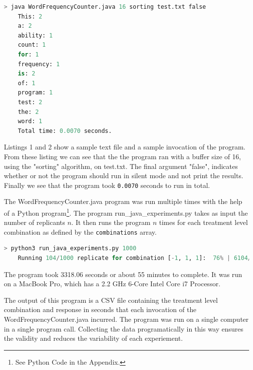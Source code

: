 \documentclass{article}
\begin{document}
  \begin{lstlisting}[language=Python, 
    basicstyle=\ttfamily\scriptsize, 
    numbers=none, 
    frame=single,
    showspaces=false,
    caption={A Sample invocation of the WordFrequencyCounter.java program}]
    > java WordFrequencyCounter.java 16 sorting test.txt false
    This: 2
    a: 2
    ability: 1
    count: 1
    for: 1
    frequency: 1
    is: 2
    of: 1
    program: 1
    test: 2
    the: 2
    word: 1
    Total time: 0.0070 seconds.
  \end{lstlisting}

  Listings 1 and 2 show a sample text file and a sample invocation of the program.
  From these listing we can see that the the program ran with a buffer size of 16,
  using the "sorting" algorithm, on test.txt. The final argument "false",
  indicates whether or not the program should run in silent mode and not print the results.
  Finally we see that the program took \texttt{0.0070} seconds to run in total.

  The WordFrequencyCounter.java program was run multiple times with the help of a Python program\footnote{See Python Code in the Appendix.}.
  The program run\_java\_experiments.py takes as input the number of replicants $n$.
  It then runs the program $n$ times for each treatment level combination as defined by the \texttt{combinations} array.

  \begin{lstlisting}[language=Python, 
    basicstyle=\ttfamily\scriptsize, 
    numbers=none, 
    frame=single,
    showspaces=false,
    caption={A Sample invocation of the run\_java\_experiments.py program}]
    > python3 run_java_experiments.py 1000
    Running 104/1000 replicate for combination [-1, 1, 1]:  76% | 6104/8000 [1:53:37<31:00,  1.02it/s]
  \end{lstlisting}

  The program took 3318.06 seconds or about 55 minutes to complete. It was run on a MacBook Pro, which has a 2.2 GHz 6-Core Intel Core i7 Processor.

  The output of this program is a CSV file containing the treatment level
  combination and response in seconds that each invocation of the WordFrequencyCounter.java incurred.
  The program was run on a single computer in a single program call.
  Collecting the data programatically
  in this way ensures the validity and reduces the variability of each experiement.
\end{document}
